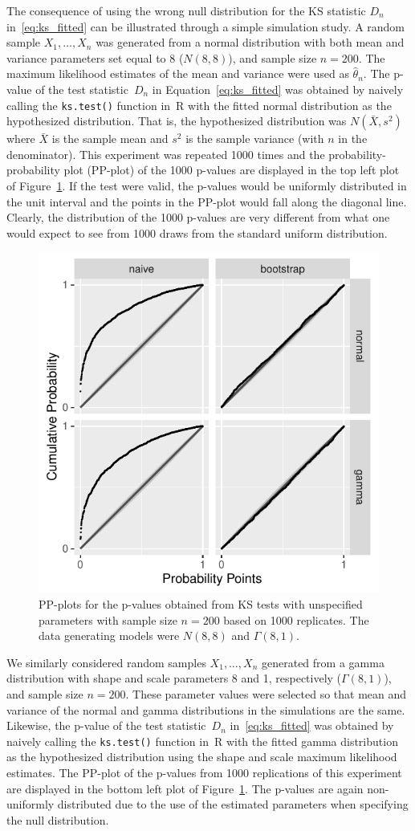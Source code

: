 \documentclass[12pt, letterpaper, titlepage]{article}
\begin{document}
The consequence of using the wrong null distribution for the KS statistic $D_n$
in~\eqref{eq:ks_fitted} can be illustrated through a simple simulation study. A
random sample $X_1, \ldots, X_n$ was generated from a normal
distribution with both mean and variance parameters set equal to 8 ($N(8,8)$), 
and sample size $n = 200$. The maximum likelihood estimates of the mean and 
variance were used as $\hat\theta_n$. The p-value of the test
statistic~$D_n$ in Equation~\eqref{eq:ks_fitted} was obtained by naively calling 
the \texttt{ks.test()} function in~R with the fitted normal distribution as the
hypothesized distribution. That is, the hypothesized distribution was
$N(\bar X, s^2)$ where $\bar X$ is the sample mean and $s^2$ is the sample
variance (with $n$ in the denominator). This experiment was repeated 1000 times
and the probability-probability plot (PP-plot) of the 1000 p-values are 
displayed in the top left plot of Figure~\ref{fig:pp_f}. If the test were
valid, the p-values would be uniformly distributed in the unit
interval and the points in the PP-plot would fall along the diagonal line. 
Clearly, the distribution of the 1000 p-values are very different from what
one would expect to see from 1000 draws from the standard uniform
distribution.  


\begin{figure}[tbp]
  \centering
  \includegraphics[width=.5\textwidth]{pp_f.pdf}
  \caption{PP-plots for the p-values obtained from KS tests with unspecified
    parameters with sample size $n = 200$ based on 1000 replicates. The data
    generating models were $N(8, 8)$ and $\Gamma(8, 1)$.
  }
  \label{fig:pp_f}
\end{figure}


We similarly considered random samples $X_1, \ldots, X_n$ 
generated from a gamma distribution with shape and scale parameters 8 and 1, 
respectively ($\Gamma(8,1)$), and sample size $n=200$. These parameter values 
were selected so that mean and variance of the normal and gamma distributions 
in the simulations are the same. Likewise, the p-value of the test 
statistic~$D_n$ in~\eqref{eq:ks_fitted} was obtained by naively calling the
\texttt{ks.test()} function in~R with the fitted gamma distribution as the
hypothesized distribution using the shape and scale maximum likelihood 
estimates. The PP-plot of the p-values from 1000 replications of this 
experiment are displayed in the bottom left plot of Figure~\ref{fig:pp_f}. The
p-values are again non-uniformly distributed due to the use of the 
estimated parameters when specifying the null distribution.
\end{document}
